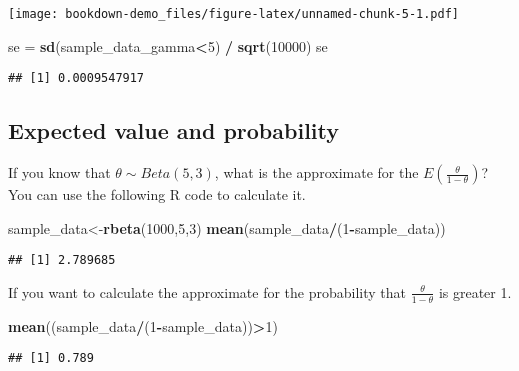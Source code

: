 \documentclass[
]{book}
\newenvironment{Shaded}{\begin{snugshade}}{\end{snugshade}}
\newcommand{\DecValTok}[1]{\textcolor[rgb]{0.00,0.00,0.81}{#1}}
\newcommand{\KeywordTok}[1]{\textcolor[rgb]{0.13,0.29,0.53}{\textbf{#1}}}
\newcommand{\NormalTok}[1]{#1}
\newcommand{\OperatorTok}[1]{\textcolor[rgb]{0.81,0.36,0.00}{\textbf{#1}}}
\newcommand{\StringTok}[1]{\textcolor[rgb]{0.31,0.60,0.02}{#1}}
\begin{document}
\texttt{[image: bookdown-demo\_files/figure-latex/unnamed-chunk-5-1.pdf]}

\begin{Shaded}
\begin{Highlighting}[]
\NormalTok{se =}\StringTok{ }\KeywordTok{sd}\NormalTok{(sample_data_gamma}\OperatorTok{<}\DecValTok{5}\NormalTok{) }\OperatorTok{/}\StringTok{ }\KeywordTok{sqrt}\NormalTok{(}\DecValTok{10000}\NormalTok{)}
\NormalTok{se}
\end{Highlighting}
\end{Shaded}

\begin{verbatim}
## [1] 0.0009547917
\end{verbatim}

\hypertarget{expected-value-and-probability}{%
\subsection{Expected value and probability}\label{expected-value-and-probability}}

If you know that \(\theta \sim Beta(5,3)\), what is the approximate for the \(E(\frac{\theta}{1-\theta})\)? You can use the following R code to calculate it.

\begin{Shaded}
\begin{Highlighting}[]
\NormalTok{sample_data<-}\KeywordTok{rbeta}\NormalTok{(}\DecValTok{1000}\NormalTok{,}\DecValTok{5}\NormalTok{,}\DecValTok{3}\NormalTok{)}
\KeywordTok{mean}\NormalTok{(sample_data}\OperatorTok{/}\NormalTok{(}\DecValTok{1}\OperatorTok{-}\NormalTok{sample_data))}
\end{Highlighting}
\end{Shaded}

\begin{verbatim}
## [1] 2.789685
\end{verbatim}

If you want to calculate the approximate for the probability that \(\frac{\theta}{1-\theta}\) is greater 1.

\begin{Shaded}
\begin{Highlighting}[]
\KeywordTok{mean}\NormalTok{((sample_data}\OperatorTok{/}\NormalTok{(}\DecValTok{1}\OperatorTok{-}\NormalTok{sample_data))}\OperatorTok{>}\DecValTok{1}\NormalTok{)}
\end{Highlighting}
\end{Shaded}

\begin{verbatim}
## [1] 0.789
\end{verbatim}
\end{document}

